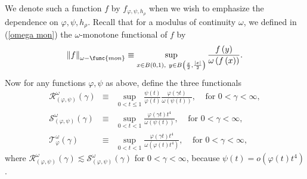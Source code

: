 \documentclass{amsart}
\theoremstyle{plain}
\numberwithin{equation}{section}
\begin{document}
We denote such a function $f$ by $f_{\varphi ,\psi ,h_{\rho }}$ when we wish
to emphasize the dependence on $\varphi ,\psi ,h_{\rho }$. Recall that for a
modulus of continuity $\omega $, we defined in (\ref{omega mon}) the $\omega 
$-monotone functional of $f$ by 
\begin{equation*}
\left\Vert f\right\Vert _{\omega -\func{mon}}\equiv \sup_{x\in B\left(
0,1\right) ,\ y\in B\left( \frac{x}{2},\frac{\left\vert x\right\vert }{2}%
\right) }\frac{f\left( y\right) }{\omega \left( f\left( x\right) \right) }.
\end{equation*}%
Now for any functions $\varphi ,\psi $ as above, define the three functionals%
\begin{eqnarray*}
\mathcal{R}_{\left( \varphi ,\psi \right) }^{\omega }\left( \gamma \right)
&\equiv &\sup_{0<t\leq 1}\frac{\psi \left( t\right) }{\varphi \left(
t\right) }\frac{\varphi \left( \gamma t\right) }{\omega \left( \psi \left(
t\right) \right) },\ \ \ \ \ \text{for }0<\gamma <\infty , \\
\mathcal{S}_{\left( \varphi ,\psi \right) }^{\omega }\left( \gamma \right)
&\equiv &\sup_{0<t<1}\frac{\varphi \left( \gamma t\right) t^{4}}{\omega
\left( \psi (t)\right) },\ \ \ \ \ \text{for }0<\gamma <\infty , \\
\mathcal{T}_{\varphi }^{\omega }\left( \gamma \right) &\equiv &\sup_{0<t<1}%
\frac{\varphi \left( \gamma t\right) t^{4}}{\omega \left( \varphi
(t)t^{4}\right) },\ \ \ \ \ \text{for }0<\gamma <\infty ,
\end{eqnarray*}%
where $\mathcal{R}_{\left( \varphi ,\psi \right) }^{\omega }\left( \gamma
\right) \lesssim \mathcal{S}_{\left( \varphi ,\psi \right) }^{\omega }\left(
\gamma \right) $ for $0<\gamma <\infty $, because $\psi \left( t\right)
=o\left( \varphi \left( t\right) t^{4}\right) $.
\end{document}
